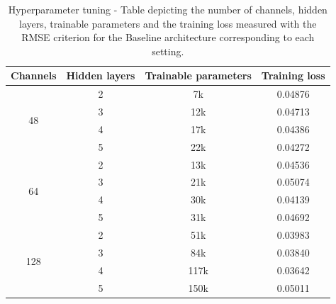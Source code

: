 \begin{table}[ht]
    \centering
    \caption{Hyperparameter tuning - Table depicting the number of channels, hidden layers, trainable parameters and the training loss measured with the RMSE criterion for the Baseline architecture corresponding to each setting.}
    \label{table:complex}
    \begin{tabular}{|c|c|c|c|}
    \hline
    \textbf{Channels} & \textbf{Hidden layers} & \textbf{Trainable parameters} & \textbf{Training loss} \\
    \hline
    \multirow{4}{*}{48} & 2 & 7k &  0.04876\\
    \cline{2-4}
                        & 3 & 12k &  0.04713\\
    \cline{2-4}
                        & 4 & 17k & 0.04386\\
    \cline{2-4}
                        & 5 & 22k &  0.04272 \\
    \hline
    \multirow{4}{*}{64} & 2 & 13k & 0.04536\\
    \cline{2-4}
                        & 3 & 21k & 0.05074 \\
    \cline{2-4}
                        & 4 & 30k &  0.04139\\
    \cline{2-4}
                        & 5 & 31k & 0.04692 \\
    \hline
    \multirow{4}{*}{128} & 2 & 51k& 0.03983\\
    \cline{2-4}         
                         & 3 & 84k & 0.03840\\
    \cline{2-4}
                         & 4 & 117k & 0.03642  \\
    \cline{2-4}
                         & 5 & 150k &  0.05011\\
    \hline
    \end{tabular}
    
    \end{table}

